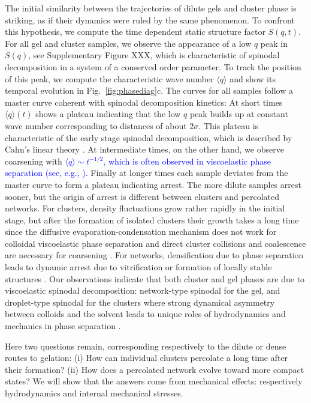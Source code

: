\documentclass[preprint,footinbib,amsmath,amssymb,superscriptaddress]{revtex4}
\begin{document}
The initial similarity between the trajectories of dilute gels and cluster phase is striking, as if their dynamics were ruled by the same phenomenon. To confront this hypothesis, we compute the time dependent static structure factor $S(q,t)$. For all gel and cluster samples, we observe the appearance of a low $q$ peak in $S(q)$, see Supplementary Figure XXX, which is characteristic of spinodal decomposition in a system of a conserved order parameter. To track the position of this peak, we compute the characteristic wave number $\langle q \rangle$ and show its temporal evolution in Fig.~\ref{fig:phasediag}c. The curves for all samples follow a master curve coherent with spinodal decomposition kinetics: At short times $\langle q \rangle(t)$ shows a plateau indicating that the low $q$ peak builds up at constant wave number corresponding to distances of about $2\sigma$. This plateau is characteristic of the early stage spinodal decomposition, which is described by Cahn's linear theory \cite{onuki2002phase}. At intermediate times, on the other hand, we observe coarsening with \textcolor{blue}{$\langle q \rangle \sim t^{-1/2}$, which is often observed in viscoelastic phase separation 
(see, e.g., \cite{Furukawa2010}).} Finally at longer times each sample deviates from the master curve to form a plateau indicating arrest. The more dilute samples arrest sooner, 
but the origin of arrest is different between clusters and percolated networks. For clusters, density fluctuations grow rather rapidly in the initial stage, but after the formation of isolated clusters their growth takes a long time since the diffusive evaporation-condensation mechanism does not work for colloidal viscoelastic phase separation and direct cluster collisions and coalescence are necessary for coarsening \cite{tanaka2000viscoelastic}. For networks, densification due to phase separation leads to dynamic arrest due to vitrification \cite{piazza1994phase,verhaegh1997,tanaka1999colloid,poon2002,zaccarelli2007,lu2008gelation} or formation of locally stable structures \cite{royall2008g}. 
Our observations indicate that both cluster and gel phases are due to viscoelastic spinodal decomposition: network-type spinodal for the gel, and droplet-type spinodal for the clusters where strong dynamical asymmetry between colloids and the solvent leads to unique roles of hydrodynamics and mechanics in phase separation \cite{tanaka1999colloid,tanaka2000viscoelastic}.

Here two questions remain, corresponding respectively to the dilute or dense routes to gelation: (i) How can individual clusters percolate a long time after their formation? (ii) How does a percolated network evolve toward more compact states? We will show that the answers come from mechanical effects: respectively hydrodynamics and internal mechanical stresses.
\end{document}
